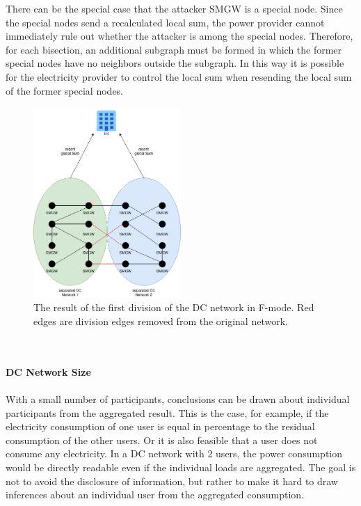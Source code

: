 There can be the special case that the attacker SMGW is a special node. Since the special nodes send a recalculated local sum, the power provider cannot immediately rule out whether the attacker is among the special nodes. Therefore, for each bisection, an additional subgraph must be formed in which the former special nodes have no neighbors outside the subgraph. In this way it is possible for the electricity provider to control the local sum when resending the local sum of the former special nodes.
\begin{figure}[tbp]
  \centering
  \includegraphics[width=0.5\textwidth]{images/DC Net Split.png}
  \caption[DC Network Splitting Algorithm]{The result of the first division of the DC network in F-mode. Red edges are division edges removed from the original network.}
  \label{fig:FirstSplitting}
\end{figure}
\\
\\
\textbf{DC Network Size}
\\
\\
With a small number of participants, conclusions can be drawn about individual participants from the aggregated result. This is the case, for example, if the electricity consumption of one user is equal in percentage to the residual consumption of the other users. Or it is also feasible that a user does not consume any electricity. In a DC network with 2 users, the power consumption would be directly readable even if the individual loads are aggregated. The goal is not to avoid the disclosure of information, but rather to make it hard to draw inferences about an individual user from the aggregated consumption.%
